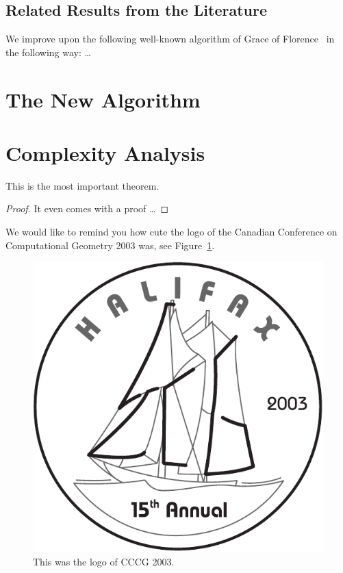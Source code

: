 \documentclass[a4paper,english,numberwithinsect]{eurocg20-submission}
\begin{document}
\subsection{Related Results from the Literature}

We improve upon the following well-known algorithm of Grace of
Florence~\cite{g-atpwog-2006} in the following way: \dots


\section{The New Algorithm}


\section{Complexity Analysis}

\begin{theorem}
This is the most important theorem.
\end{theorem}
\begin{proof}
It even comes with a proof \dots
\end{proof}


We would like to remind you how cute the logo of the Canadian
Conference on Computational Geometry 2003 was,
see Figure~\ref{fig:logo}.

\begin{figure}[ht]
  \centering
  \includegraphics[scale=0.5]{example_figure}
  \caption{This was the logo of CCCG 2003.}
  \label{fig:logo}
\end{figure}
\end{document}
